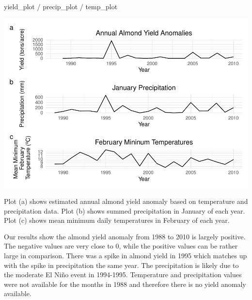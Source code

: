 \documentclass[
]{article}
\newenvironment{Shaded}{\begin{snugshade}}{\end{snugshade}}
\newcommand{\NormalTok}[1]{#1}
\newcommand{\SpecialCharTok}[1]{\textcolor[rgb]{0.00,0.00,0.00}{#1}}
\begin{document}
\begin{Shaded}
\begin{Highlighting}[]
\NormalTok{yield\_plot }\SpecialCharTok{/}\NormalTok{ precip\_plot }\SpecialCharTok{/}\NormalTok{ temp\_plot}
\end{Highlighting}
\end{Shaded}

\includegraphics{assignment2_almond_files/figure-latex/unnamed-chunk-6-1.pdf}

Plot (a) shows estimated annual almond yield anomaly based on
temperature and precipitation data. Plot (b) shows summed precipitation
in January of each year. Plot (c) shows mean minimum daily temperatures
in February of each year.

Our results show the almond yield anomaly from 1988 to 2010 is largely
positive. The negative values are very close to 0, while the positive
values can be rather large in comparison. There was a spike in almond
yield in 1995 which matches up with the spike in precipitation the same
year. The precipitation is likely due to the moderate El Niño event in
1994-1995. Temperature and precipitation values were not available for
the months in 1988 and therefore there is no yield anomaly available.
\end{document}
